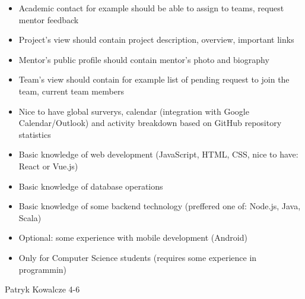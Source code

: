 \begin{project}
{\begin{small}
\begin{itemize}
	\item Academic contact for example should be able to assign to teams, request mentor feedback
	\item Project’s view should contain project description, overview, important links
	\item Mentor’s public profile should contain mentor's photo and biography
	\item Team’s view should contain for example list of pending request to join the team, current team members
	\item Nice to have global surverys, calendar (integration with Google Calendar/Outlook) and activity breakdown based on GitHub repository statistics
\end{itemize}
\end{small}
}
{
\begin{small}
\begin{itemize}
	\item Basic knowledge of web development (JavaScript, HTML, CSS, nice to have: React or Vue.js)
	\item Basic knowledge of database operations
	\item Basic knowledge of some backend technology (preffered one of: Node.js, Java, Scala)
	\item Optional: some experience with mobile development (Android)
	\item Only for Computer Science students (requires some experience in programmin)
\end{itemize}
\end{small}
}
{Patryk Kowalcze}
{4-6}
\end{project}
